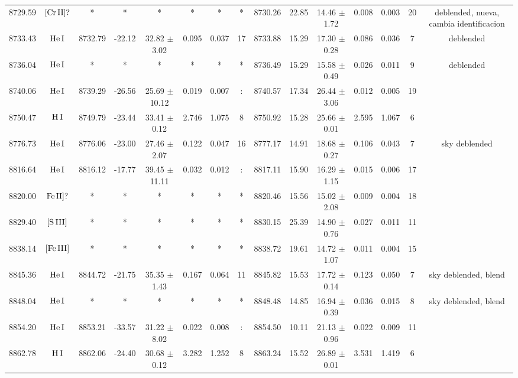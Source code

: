 \documentclass{article}
\begin{document}
\begin{table*}
\begin{adjustbox}{width=\textwidth}
\begin{tabular}{ccccccccccccccc}
8729.59 & $\mbox{[Cr}\thinspace \mbox{II]?}$ & * & * & * & * & * & * & 8730.26 & 22.85 & 14.46 $\pm$ 1.72 & 0.008 & 0.003 & 20 &  deblended, nueva, cambia identificacion \\
8733.43 & $\mbox{He}\thinspace \mbox{I}$ & 8732.79 & -22.12 & 32.82 $\pm$ 3.02 & 0.095 & 0.037 & 17 & 8733.88 & 15.29 & 17.30 $\pm$ 0.28 & 0.086 & 0.036 & 7 &  deblended \\
8736.04 & $\mbox{He}\thinspace \mbox{I}$ & * & * & * & * & * & * & 8736.49 & 15.29 & 15.58 $\pm$ 0.49 & 0.026 & 0.011 & 9 &  deblended \\
8740.06 & $\mbox{He}\thinspace \mbox{I}$ & 8739.29 & -26.56 & 25.69 $\pm$ 10.12 & 0.019 & 0.007 & : & 8740.57 & 17.34 & 26.44 $\pm$ 3.06 & 0.012 & 0.005 & 19 &  \\
8750.47 & $\mbox{H}\thinspace \mbox{I}$ & 8749.79 & -23.44 & 33.41 $\pm$ 0.12 & 2.746 & 1.075 & 8 & 8750.92 & 15.28 & 25.66 $\pm$ 0.01 & 2.595 & 1.067 & 6 &  \\
8776.73 & $\mbox{He}\thinspace \mbox{I}$ & 8776.06 & -23.00 & 27.46 $\pm$ 2.07 & 0.122 & 0.047 & 16 & 8777.17 & 14.91 & 18.68 $\pm$ 0.27 & 0.106 & 0.043 & 7 &  sky deblended \\
8816.64 & $\mbox{He}\thinspace \mbox{I}$ & 8816.12 & -17.77 & 39.45 $\pm$ 11.11 & 0.032 & 0.012 & : & 8817.11 & 15.90 & 16.29 $\pm$ 1.15 & 0.015 & 0.006 & 17 &  \\
8820.00 & $\mbox{Fe}\thinspace \mbox{II]?}$ & * & * & * & * & * & * & 8820.46 & 15.56 & 15.02 $\pm$ 2.08 & 0.009 & 0.004 & 18 &  \\
8829.40 & $\mbox{[S}\thinspace \mbox{III]}$ & * & * & * & * & * & * & 8830.15 & 25.39 & 14.90 $\pm$ 0.76 & 0.027 & 0.011 & 11 &  \\
8838.14 & $\mbox{[Fe}\thinspace \mbox{III]}$ & * & * & * & * & * & * & 8838.72 & 19.61 & 14.72 $\pm$ 1.07 & 0.011 & 0.004 & 15 &  \\
8845.36 & $\mbox{He}\thinspace \mbox{I}$ & 8844.72 & -21.75 & 35.35 $\pm$ 1.43 & 0.167 & 0.064 & 11 & 8845.82 & 15.53 & 17.72 $\pm$ 0.14 & 0.123 & 0.050 & 7 &  sky deblended, blend \\
8848.04 & $\mbox{He}\thinspace \mbox{I}$ & * & * & * & * & * & * & 8848.48 & 14.85 & 16.94 $\pm$ 0.39 & 0.036 & 0.015 & 8 &  sky deblended, blend \\
8854.20 & $\mbox{He}\thinspace \mbox{I}$ & 8853.21 & -33.57 & 31.22 $\pm$ 8.02 & 0.022 & 0.008 & : & 8854.50 & 10.11 & 21.13 $\pm$ 0.96 & 0.022 & 0.009 & 11 &  \\
8862.78 & $\mbox{H}\thinspace \mbox{I}$ & 8862.06 & -24.40 & 30.68 $\pm$ 0.12 & 3.282 & 1.252 & 8 & 8863.24 & 15.52 & 26.89 $\pm$ 0.01 & 3.531 & 1.419 & 6 &  \\

\end{tabular}
\end{adjustbox}
\end{table*}
\end{document}

